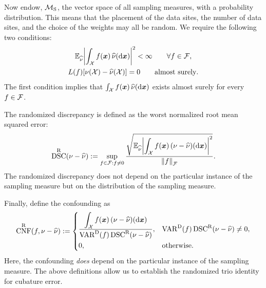 \documentclass[graybox,footinfo]{svmult}
\DeclareMathOperator{\algn}{CNF}
\DeclareMathOperator{\disc}{DSC}
\DeclareMathOperator{\Var}{VAR}
\begin{document}
Now endow, $\mathcal{M}_{\textup{S}}$, the vector space of all sampling measures, with a 
probability distribution.  This means that the placement of the data sites, the number of 
data sites, and the choice of the weights may all be random.  We require  
the following two conditions:
\begin{subequations} \label{FJH:eq:randMcond}
\begin{gather}
\bbE_{\hnu} \biggabs{\int_{\cx} f(\bsx) \,  \hnu(\D \bsx)}^2 < \infty \qquad \forall f \in \cf, \\
\label{FJH:eq:randMcondB}
L(f) [\nu(\calX) - \hnu(\calX)] = 0  \qquad \text{almost surely}.
\end{gather}
\end{subequations}
The first condition implies that $\int_{\mathcal{X}} f({\boldsymbol{x}}) \,  \widehat{\nu}(\mathrm{d} {\boldsymbol{x}})$ exists 
almost surely for every $f \in \mathcal{F}$.  

The randomized discrepancy is  defined as the worst  normalized root mean squared 
error:
\begin{equation} \label{FJH:eq:rnddiscdef}
\disc^\Rn(\nu - \hnu) : =\sup_{f \in \cf : f \ne 0} \frac{\displaystyle \sqrt{\bbE_{\hnu}
\biggabs{\int_{\cx} 
		f(\bsx) \, (\nu - \hnu)(\D \bsx)}^2}}{\norm{f}_{\cf}}.
\end{equation}
The randomized discrepancy does not depend on the particular instance of the 
sampling measure but on the distribution of the sampling measure. 

Finally, define the confounding as 
\begin{equation} \label{FJH:eq:rndconfdef}
\algn^\Rn(f,\nu - \hnu): =  \begin{cases} \displaystyle 
\frac{\displaystyle\int_{\cx} f(\bsx) \, (\nu - \hnu)(\D 
	\bsx)}{\Var^\Dt(f)\disc^\Rn(\nu - \hnu)},  & 
\Var^\Dt(f)\disc^\Rn(\nu - \hnu) \ne 0, \\[2ex]
0, & \text{otherwise}.
\end{cases}
\end{equation}
Here, the confounding \emph{does} depend on the particular instance of the sampling 
measure.  The above definitions allow us to establish the randomized trio identity for 
cubature 
error.
\end{document}
